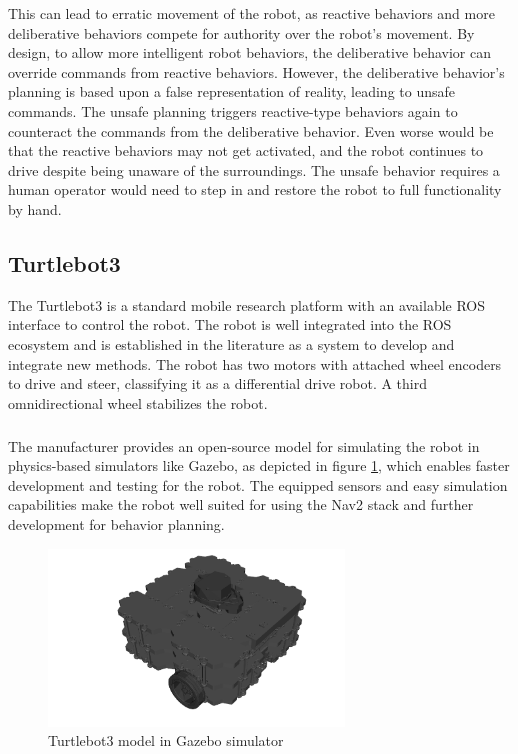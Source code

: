 This can lead to erratic movement of the robot, as reactive behaviors and more deliberative behaviors compete for authority over the robot's movement. By design, to allow more intelligent robot behaviors, the deliberative behavior can override commands from reactive behaviors. However, the deliberative behavior's planning is based upon a false representation of reality, leading to unsafe commands. The unsafe planning triggers reactive-type behaviors again to counteract the commands from the deliberative behavior. Even worse would be that the reactive behaviors may not get activated, and the robot continues to drive despite being unaware of the surroundings. The unsafe behavior requires a human operator would need to step in and restore the robot to full functionality by hand. 



\subsection{Turtlebot3}
The Turtlebot3 is a standard mobile research platform with an available ROS interface to control the robot. The robot is well integrated into the ROS ecosystem and is established in the literature as a system to develop and integrate new methods. 
The robot has two motors with attached wheel encoders to drive and steer, classifying it as a differential drive robot. A third omnidirectional wheel stabilizes the robot. 
\subparagraph*{}
The manufacturer provides an open-source model for simulating the robot in physics-based simulators like Gazebo, as depicted in figure \ref{fig:turtlebot}, which enables faster development and testing for the robot. 
The equipped sensors and easy simulation capabilities make the robot well suited for using the Nav2 stack and further development for behavior planning. 


\begin{figure}[ht]   
	\includegraphics[width=0.7\textwidth]{images/turtlebot_sim.png}
	\caption{Turtlebot3 model in Gazebo simulator}
	\label{fig:turtlebot}
\end{figure}

